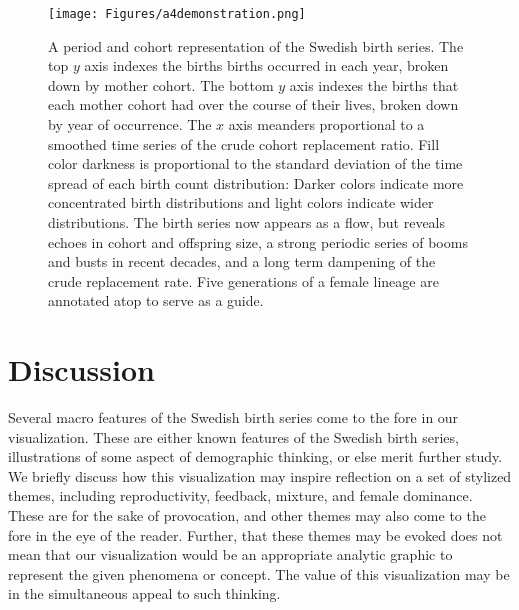 \documentclass{article}
\begin{document}
\begin{figure}
\texttt{[image: Figures/a4demonstration.png]}
\caption{A period and cohort representation of the Swedish birth series. The top $y$ axis indexes the births births occurred in each year, broken down by mother cohort. The bottom $y$ axis indexes the births that each mother cohort had over the course of their lives, broken down by year of occurrence. The $x$ axis meanders proportional to a smoothed time series of the crude cohort replacement ratio. Fill color darkness is proportional to the standard deviation of the time spread of each birth count distribution: Darker colors indicate more concentrated birth distributions and light colors indicate wider distributions. The birth series now appears as a flow, but reveals echoes in cohort and offspring size, a strong periodic series of booms and busts in recent decades, and a long term dampening of the crude replacement rate. Five generations of a female lineage are annotated atop to serve as a guide.}
\label{fig:foldout}
\end{figure}

\section{Discussion}
\label{sec:disc}
Several macro features of the Swedish birth series come to the fore in our visualization. These are either known features of the Swedish birth series, illustrations of some aspect of demographic thinking, or else merit further study. We briefly discuss how this visualization may inspire reflection on a set of stylized themes, including reproductivity, feedback, mixture, and female dominance. These are for the sake of provocation, and other themes may also come to the fore in the eye of the reader. Further, that these themes may be evoked does not mean that our visualization would be an appropriate analytic graphic to represent the given phenomena or concept. The value of this visualization may be in the simultaneous appeal to such thinking.
\end{document}
